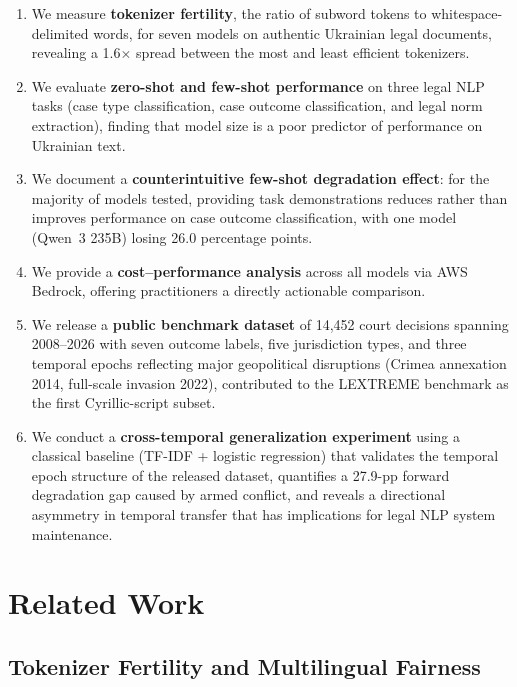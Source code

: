 \documentclass[11pt,a4paper]{article}
\begin{document}
\begin{enumerate}[leftmargin=*]
    \item We measure \textbf{tokenizer fertility}, the ratio of subword tokens to whitespace-delimited words, for seven models on authentic Ukrainian legal documents, revealing a 1.6$\times$ spread between the most and least efficient tokenizers.
    \item We evaluate \textbf{zero-shot and few-shot performance} on three legal NLP tasks (case type classification, case outcome classification, and legal norm extraction), finding that model size is a poor predictor of performance on Ukrainian text.
    \item We document a \textbf{counterintuitive few-shot degradation effect}: for the majority of models tested, providing task demonstrations reduces rather than improves performance on case outcome classification, with one model (Qwen~3 235B) losing 26.0 percentage points.
    \item We provide a \textbf{cost--performance analysis} across all models via AWS Bedrock, offering practitioners a directly actionable comparison.
    \item We release a \textbf{public benchmark dataset} of 14,452 court decisions spanning 2008--2026 with seven outcome labels, five jurisdiction types, and three temporal epochs reflecting major geopolitical disruptions (Crimea annexation 2014, full-scale invasion 2022), contributed to the LEXTREME benchmark as the first Cyrillic-script subset.
    \item We conduct a \textbf{cross-temporal generalization experiment} using a classical baseline (TF-IDF + logistic regression) that validates the temporal epoch structure of the released dataset, quantifies a 27.9-pp forward degradation gap caused by armed conflict, and reveals a directional asymmetry in temporal transfer that has implications for legal NLP system maintenance.
\end{enumerate}

\section{Related Work}

\subsection{Tokenizer Fertility and Multilingual Fairness}
\end{document}
